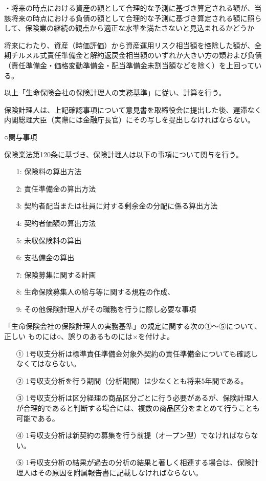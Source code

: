 \documentclass[report,gutter=10mm,fore-edge=10mm,uplatex,dvipdfmx]{jlreq}
\begin{document}
・将来の時点における資産の額として合理的な予測に基づき算定される額が、当該将来の時点における負債の額として合理的な予測に基づき算定される額に照らして、保険業の継続の観点から適正な水準を満たさないと見込まれるかどうか

将来にわたり、資産（時価評価）から資産運用リスク相当額を控除した額が、全期チルメル式責任準備金と解約返戻金相当額のいずれか大きい方の類および負債（責任準備金・価格変動準備金・配当準備金未割当額などを除く）を上回っている。

以上「生命保険会社の保険計理人の実務基準」に従い、計算を行う。

保険計理人は、上記確認事項について意見書を取締役会に提出した後、遅滞なく内閣総理大臣（実際には金融庁長官）にその写しを提出しなければならない。

○関与事項

保険業法第120条に基づき、保険計理人は以下の事項について関与を行う。

\begin{itemize}
 \item[1: ] 保険料の算出方法
 \item[2: ] 責任準備金の算出方法
 \item[3: ] 契約者配当または社員に対する剰余金の分配に係る算出方法
 \item[4: ] 契約者価額の算出方法
 \item[5: ] 未収保険料の算出
 \item[6: ] 支払備金の算出
 \item[7: ] 保険募集に関する計画
 \item[8: ] 生命保険募集人の給与等に関する規程の作成、
 \item[9: ] その他保険計理人がその職務を行うに際し必要な事項
\end{itemize}

「生命保険会社の保険計理人の実務基準」の規定に関する次の①〜⑤について、正しい
ものには○、誤りのあるものには×を付けよ。

\begin{itemize}
\item[ ①] 1号収支分析は標準責任準備金対象外契約の責任準備金についても確認しなくてはならない。
\item[ ②] 1号収支分析を行う期間（分析期間）は少なくとも将来5年間である。
\item[ ③] 1号収支分析は区分経理の商品区分ごとに行う必要があるが、保険計理人が合理的であると判断する場合には、複数の商品区分をまとめて行うことも可能である。
\item[ ④] 1号収支分析は新契約の募集を行う前提（オープン型）でなければならない。
\item[ ⑤] 1号収支分析の結果が過去の分析の結果と著しく相連する場合は、保険計理人はその原因を附属報告書に記載しなければならない。
\end{itemize}
\end{document}
